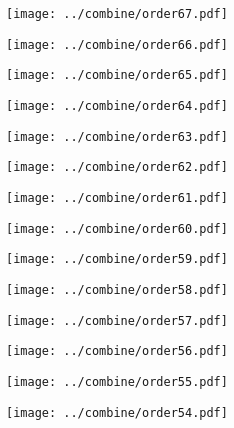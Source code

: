 \documentclass{article}
\begin{document}
\begin{figure}[H]
    \centering
    \texttt{[image: ../combine/order67.pdf]}
\end{figure}
\begin{figure}[H]
    \centering
    \texttt{[image: ../combine/order66.pdf]}
\end{figure}
\begin{figure}[H]
    \centering
    \texttt{[image: ../combine/order65.pdf]}
\end{figure}
\begin{figure}[H]
    \centering
    \texttt{[image: ../combine/order64.pdf]}
\end{figure}
\begin{figure}[H]
    \centering
    \texttt{[image: ../combine/order63.pdf]}
\end{figure}
\begin{figure}[H]
    \centering
    \texttt{[image: ../combine/order62.pdf]}
\end{figure}
\begin{figure}[H]
    \centering
    \texttt{[image: ../combine/order61.pdf]}
\end{figure}
\begin{figure}[H]
    \centering
    \texttt{[image: ../combine/order60.pdf]}
\end{figure}
\begin{figure}[H]
    \centering
    \texttt{[image: ../combine/order59.pdf]}
\end{figure}
\begin{figure}[H]
    \centering
    \texttt{[image: ../combine/order58.pdf]}
\end{figure}
\begin{figure}[H]
    \centering
    \texttt{[image: ../combine/order57.pdf]}
\end{figure}
\begin{figure}[H]
    \centering
    \texttt{[image: ../combine/order56.pdf]}
\end{figure}
\begin{figure}[H]
    \centering
    \texttt{[image: ../combine/order55.pdf]}
\end{figure}
\begin{figure}[H]
    \centering
    \texttt{[image: ../combine/order54.pdf]}
\end{figure}
\end{document}
